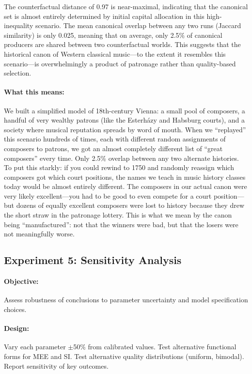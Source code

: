 \documentclass[11pt,a4paper]{article}
\begin{document}
The counterfactual distance of 0.97 is near-maximal, indicating that the canonical set is almost entirely determined by initial capital allocation in this high-inequality scenario. The mean canonical overlap between any two runs (Jaccard similarity) is only 0.025, meaning that on average, only 2.5\% of canonical producers are shared between two counterfactual worlds. This suggests that the historical canon of Western classical music---to the extent it resembles this scenario---is overwhelmingly a product of patronage rather than quality-based selection.

\paragraph{What this means:} We built a simplified model of 18th-century Vienna: a small pool of composers, a handful of very wealthy patrons (like the Esterh\'{a}zy and Habsburg courts), and a society where musical reputation spreads by word of mouth. When we ``replayed'' this scenario hundreds of times, each with different random assignments of composers to patrons, we got an almost completely different list of ``great composers'' every time. Only 2.5\% overlap between any two alternate histories. To put this starkly: if you could rewind to 1750 and randomly reassign which composers got which court positions, the names we teach in music history classes today would be almost entirely different. The composers in our actual canon were very likely excellent---you had to be good to even compete for a court position---but dozens of equally excellent composers were lost to history because they drew the short straw in the patronage lottery. This is what we mean by the canon being ``manufactured'': not that the winners were bad, but that the losers were not meaningfully worse.

\subsection{Experiment 5: Sensitivity Analysis}

\paragraph{Objective:} Assess robustness of conclusions to parameter uncertainty and model specification choices.

\paragraph{Design:} Vary each parameter $\pm$50\% from calibrated values. Test alternative functional forms for MEE and SI. Test alternative quality distributions (uniform, bimodal). Report sensitivity of key outcomes.
\end{document}
